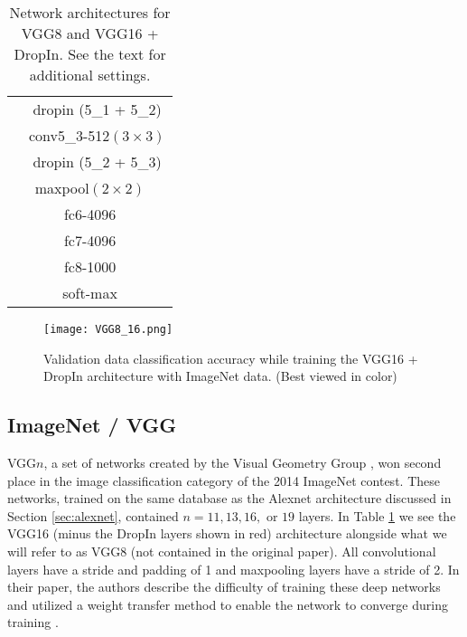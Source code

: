 \documentclass[10pt,twocolumn,letterpaper]{article}
\newcommand{\dropin}{DropIn }
\newcommand{\dropinNS}{DropIn}
\begin{document}
\begin{table}[htb]
\begin{center}
\begin{tabular}{| c | c |}
 &{\color{red}dropin (5\_1 + 5\_2)}\\ 
  &   			 conv5\_3-512$(3\times 3)$ \\ 
   &  			      {\color{red} dropin (5\_2 + 5\_3)}\\ \hline
\multicolumn{2}{|c|}{maxpool$(2\times2)$} \\ \hline
\multicolumn{2}{|c|}{fc6-4096} \\ \hline
\multicolumn{2}{|c|}{fc7-4096} \\ \hline
\multicolumn{2}{|c|}{fc8-1000} \\ \hline
\multicolumn{2}{|c|}{soft-max} \\ \hline
    
  \end{tabular}
  \caption{Network architectures for VGG8 and VGG16 + \dropinNS.  See the text for additional settings.}
  \label{tab:vgg_dropin}
\end{center}
  \vspace{-15pt}
\end{table}



\begin{figure}[]
\begin{center}
   \texttt{[image: VGG8\_16.png]}
\end{center}
  \vspace{-15pt}
   \caption{Validation data classification accuracy while training the VGG16 + \dropin architecture with ImageNet data. (Best viewed in color)
}
\label{fig:vgg_plot}
  \vspace{-10pt}
\end{figure}



\subsection{ImageNet / VGG}
\label{sec:vgg}
VGG$n$, a set of networks created by the Visual Geometry Group \cite{simonyan2014very}, won second place in the image classification category of the 2014 ImageNet contest.  These networks, trained on the same database as the Alexnet architecture discussed in Section \ref{sec:alexnet}, contained $ n=11,13,16,\mbox{ or }19$ layers.  In Table \ref{tab:vgg_dropin} we see the VGG16 (minus the \dropin layers shown in red) architecture alongside what we will refer to as VGG8 (not contained in the original paper).
All convolutional layers have a stride and padding of 1 and maxpooling layers have a stride of 2. 
In their paper, the authors describe the difficulty of training these deep networks and utilized a weight transfer method to enable the network to converge during training \cite{simonyan2014very}.
\end{document}
